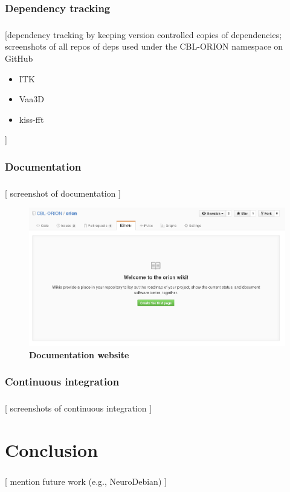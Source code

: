 \documentclass{beamer}
\begin{document}
\subsubsection{Dependency tracking}
\begin{frame}\frametitle{\subsubsecname}
	[dependency tracking by keeping version controlled copies
		of dependencies; screenshots of all repos of deps used under the CBL-ORION
	namespace on GitHub
	\begin{itemize}
		\item ITK
		\item Vaa3D
		\item kiss-fft
	\end{itemize}
	]
\end{frame}

\subsubsection{Documentation}
\begin{frame}\frametitle{\subsubsecname}
	[ screenshot of documentation ]
		\begin{figure}[tbp]
			\centering
			\includegraphics[width=1.0\textwidth]{gfx/doc_placeholder}
			\caption{\textbf{Documentation website}
			}\label{fig:doc-wiki}
		\end{figure}
\end{frame}


\subsubsection{Continuous integration}
\begin{frame}\frametitle{\subsecname}
	[
		{screenshots of continuous integration}
	]
\end{frame}


\section{Conclusion}
\begin{frame}\frametitle{\secname}
	[
		mention future work (e.g., NeuroDebian)
	]
\end{frame}


\end{document}
